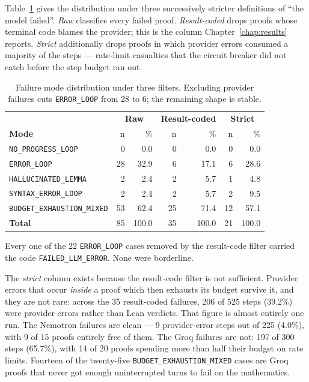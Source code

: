 Table~\ref{tab:ft_filter} gives the distribution under three successively
stricter definitions of ``the model failed''.
\emph{Raw} classifies every failed proof.
\emph{Result-coded} drops proofs whose terminal code blames the provider; this
is the column Chapter~\ref{chap:results} reports.
\emph{Strict} additionally drops proofs in which provider errors consumed a
majority of the steps --- rate-limit casualties that the circuit breaker did not
catch before the step budget ran out.

\begin{table}[htbp]
\centering
\caption{Failure mode distribution under three filters. Excluding provider
failures cuts \texttt{ERROR\_LOOP} from 28 to 6; the remaining shape is stable.}
\label{tab:ft_filter}
\begin{tabular}{@{}lrrrrrr@{}}
\hline
 & \multicolumn{2}{c}{\textbf{Raw}} & \multicolumn{2}{c}{\textbf{Result-coded}}
 & \multicolumn{2}{c}{\textbf{Strict}} \\
\textbf{Mode} & n & \% & n & \% & n & \% \\
\hline
\texttt{NO\_PROGRESS\_LOOP}        &  0 &  0.0 &  0 &  0.0 &  0 &  0.0 \\
\texttt{ERROR\_LOOP}               & 28 & 32.9 &  6 & 17.1 &  6 & 28.6 \\
\texttt{HALLUCINATED\_LEMMA}       &  2 &  2.4 &  2 &  5.7 &  1 &  4.8 \\
\texttt{SYNTAX\_ERROR\_LOOP}       &  2 &  2.4 &  2 &  5.7 &  2 &  9.5 \\
\texttt{BUDGET\_EXHAUSTION\_MIXED} & 53 & 62.4 & 25 & 71.4 & 12 & 57.1 \\
\hline
\textbf{Total}                     & 85 & 100.0 & 35 & 100.0 & 21 & 100.0 \\
\hline
\end{tabular}
\end{table}

Every one of the 22 \texttt{ERROR\_LOOP} cases removed by the result-code filter
carried the code \texttt{FAILED\_LLM\_ERROR}. None were borderline.

The \emph{strict} column exists because the result-code filter is not sufficient.
Provider errors that occur \emph{inside} a proof which then exhausts its budget
survive it, and they are not rare: across the 35 result-coded failures, 206 of
525 steps (39.2\%) were provider errors rather than Lean verdicts. That figure is
almost entirely one run. The Nemotron failures are clean --- 9 provider-error
steps out of 225 (4.0\%), with 9 of 15 proofs entirely free of them. The Groq
failures are not: 197 of 300 steps (65.7\%), with 14 of 20 proofs spending more
than half their budget on rate limits. Fourteen of the twenty-five
\texttt{BUDGET\_EXHAUSTION\_MIXED} cases are Groq proofs that never got enough
uninterrupted turns to fail on the mathematics.

